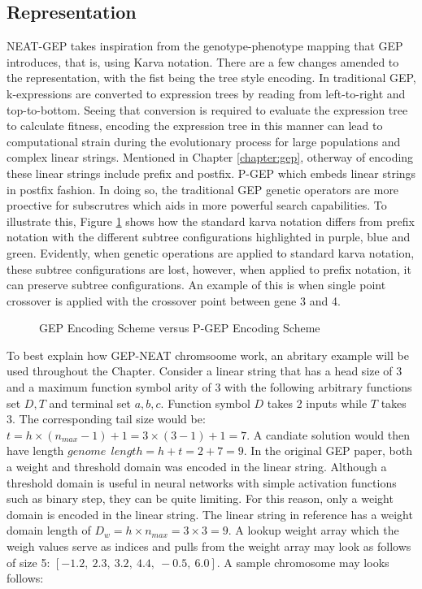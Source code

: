 \subsection{Representation}\label{sec:gep_neat_representation}
NEAT-GEP takes inspiration from the genotype-phenotype mapping that GEP introduces, that is, using Karva notation. There are a few changes amended to the representation, with the fist being the tree style encoding. In traditional GEP, k-expressions are converted to expression trees by reading from left-to-right and top-to-bottom. Seeing that conversion is required to evaluate the expression  tree to calculate fitness, encoding the expression tree in this manner can lead to computational strain during the evolutionary process for large populations and complex linear strings. Mentioned in Chapter \ref{chapter:gep}, otherway of encoding these linear strings include prefix and postfix. P-GEP which embeds linear strings in postfix fashion. In doing so, the traditional GEP genetic operators are more proective for subscrutres which aids in more powerful search capabilities. To illustrate this, Figure \ref{fig:gep_neat_p_gep} shows how the standard karva notation differs from prefix notation with the different subtree configurations highlighted in purple, blue and green. Evidently, when genetic operations are applied to standard karva notation, these subtree configurations are lost, however, when applied to prefix notation, it can preserve subtree configurations. An example of this is when single point crossover is applied with the crossover point between gene 3 and 4.

\begin{figure}[H] %
	\centering %
	\caption{GEP Encoding Scheme versus P-GEP Encoding Scheme}
	\label{fig:gep_neat_p_gep} %
\end{figure}

\noindent To best explain how GEP-NEAT chromsoome work, an abritary example will be used throughout the Chapter. Consider a linear string that has a head size of $3$ and a maximum function symbol arity of $3$ with the following arbitrary functions set ${D, T}$ and terminal set ${a, b, c}$. Function symbol $D$ takes 2 inputs while $T$ takes 3. The corresponding tail size would be: $t = h \times (n_{max} - 1) + 1 = 3 \times (3 - 1) + 1 = 7$. A candiate solution would then have length $genome \:\: length = h + t = 2 + 7 = 9$. In the original GEP paper, both a weight and threshold domain was encoded in the linear string. Although a threshold domain is useful in neural networks with simple activation functions such as binary step, they can be quite limiting. For this reason, only a weight domain is encoded in the linear string. The linear string in reference has a weight domain length of $D_w = h \times n_{max} = 3 \times 3 = 9$. A lookup weight array which the weigh values serve as indices and pulls from the weight array may look as follows of size 5: $[-1.2,\:2.3,\:3.2,\:4.4,\:-0.5,\:6.0]$. A sample chromosome may looks follows:

